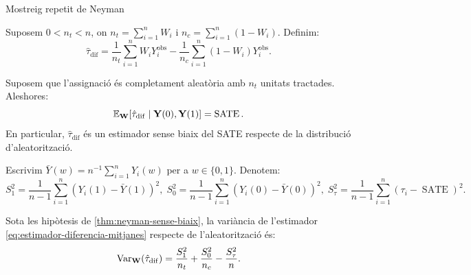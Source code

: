\documentclass{bestbeamer}
\begin{document}
\begin{frame}[allowframebreaks]{Mostreig repetit de Neyman}
\begin{definition}\label{def:estimador-diferencia-mitjanes}
Suposem $0<n_t<n$, on $n_t=\sum_{i=1}^n W_i$ i $n_c=\sum_{i=1}^n(1-W_i)$. Definim:
\begin{equation*}\label{eq:estimador-diferencia-mitjanes}
\hat\tau_{\operatorname{dif}}
=
\frac{1}{n_t}\sum_{i=1}^n W_iY_i^{\operatorname{obs}}
-
\frac{1}{n_c}\sum_{i=1}^n (1-W_i)Y_i^{\operatorname{obs}}.
\end{equation*}
\end{definition}
\begin{theorem}\label{thm:neyman-sense-biaix}
Suposem que l'assignació és completament aleatòria amb $n_t$ unitats tractades. Aleshores:
\begin{equation*}
\mathbb{E}_{\mathbf{W}}\!\left[\hat\tau_{\operatorname{dif}}\mid \mathbf{Y}(0),\mathbf{Y}(1)\right]
=
\operatorname{SATE}.
\end{equation*}
En particular, $\hat\tau_{\operatorname{dif}}$ és un estimador sense biaix del SATE respecte de la distribució d'aleatorització.
\end{theorem}

\begin{notation}\label{not:variancies-neyman}
Escrivim $\bar{Y}(w)=n^{-1}\sum_{i=1}^nY_i(w)$ per a $w\in\{0,1\}$. Denotem:
\begin{equation*}
S_1^2=\frac{1}{n-1}\sum_{i=1}^n\left(Y_i(1)-\bar{Y}(1)\right)^2,\;
S_0^2=\frac{1}{n-1}\sum_{i=1}^n\left(Y_i(0)-\bar{Y}(0)\right)^2,\;
S_\tau^2=\frac{1}{n-1}\sum_{i=1}^n\left(\tau_i-\operatorname{SATE}\right)^2.
\end{equation*}
\end{notation}

\begin{theorem}\label{thm:variancia-neyman}
Sota les hipòtesis de \ref{thm:neyman-sense-biaix}, la variància de l'estimador \eqref{eq:estimador-diferencia-mitjanes} respecte de l'aleatorització és:
\begin{equation*}
\operatorname{Var}_{\mathbf{W}}(\hat\tau_{\operatorname{dif}})
=
\frac{S_1^2}{n_t}
+
\frac{S_0^2}{n_c}
-
\frac{S_\tau^2}{n}.
\end{equation*}
\end{theorem}


\end{frame}
\end{document}
